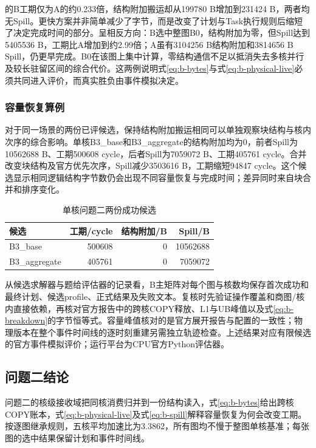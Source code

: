 的B工期仅为A的约0.233倍，结构附加搬运却从199780 B增加到231424 B，两者均无Spill。更快方案并非简单减少了字节，而是改变了计划与Task执行规则后缩短了决定完成时间的部分。呈相反方向：B选中整图B0，结构附加为零，但Spill达到5405536 B，工期比A增加到约2.99倍；A虽有3104256 B结构附加和3814656 B Spill，仍更早完成。B0在该图上集中计算，零结构通信不足以抵消失去多核并行及较长驻留区间的综合代价。这两例说明式\eqref{eq:b-bytes}与式\eqref{eq:b-physical-live}必须共同进入评价，而真实胜负由事件模拟决定。

\subsubsection{容量恢复算例}
对于同一场景的两份已评候选，保持结构附加搬运相同可以单独观察块结构与核内次序的综合影响。单核B3\_base和B3\_aggregate的结构附加均为0，前者Spill为10562688 B、工期500608 cycle，后者Spill为7059072 B、工期405761 cycle。合并改变块结构及官方优先次序，Spill减少3503616 B，工期缩短94847 cycle。这个候选显示相同逻辑结构字节数仍会出现不同容量恢复与完成时间；差异同时来自块合并和排序变化。

\begin{table}[H]\centering\caption{单核问题二两份成功候选}\label{tab:b-case008}
\begin{tabular}{lrrr}\toprule
候选 & 工期/cycle & 结构附加/B & Spill/B\\\midrule
B3\_base & 500608 & 0 & 10562688\\
B3\_aggregate & 405761 & 0 & 7059072\\\bottomrule
\end{tabular}\end{table}

从候选求解器与题给评估器的记录看，B主矩阵对每个图与核数均保存首次成功和最终计划、候选profile、正式结果及失败文本。复核时先验证操作覆盖和商图/核内直接依赖，再核对官方报告中的跨核COPY释放、L1与UB峰值以及式\eqref{eq:b-breakdown}的字节恒等式。容量峰值核对的是官方展开报告与配置的一致性；物理版本在整个事件时间线的逐时刻重建另需独立轨迹检查。上述结果对应有限候选的官方事件模拟评价；运行平台为CPU官方Python评估器。

\subsection{问题二结论}
问题二的核级接收域把同核消费归并到一份结构读入，式\eqref{eq:b-bytes}给出跨核COPY账本，式\eqref{eq:b-physical-live}及式\eqref{eq:b-spill}解释容量恢复为何会改变工期。按逐图继承规则，五核平均加速比为3.3862，所有图均不慢于整图单核基准；每张图的选中结果保留计划和事件时间线。


